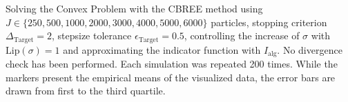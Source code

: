 Solving the Convex Problem with the CBREE method using  $J \in \{250, 500, 1000, 2000, 3000, 4000, 5000, 6000\}$ particles, stopping criterion $\Delta_{\text{Target}} = 2$, stepsize tolerance $\epsilon_{\text{Target}} = 0.5$, controlling the increase of $\sigma$ with $\text{Lip}(\sigma) = 1$ and approximating the indicator function with $I_\text{alg}$. No divergence check has been performed. Each simulation was repeated 200 times. While the markers present the empirical means of the visualized data, the error bars are drawn from first to the third quartile.